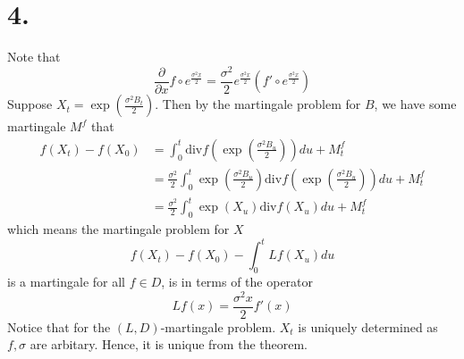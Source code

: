 \documentclass[11pt]{article}
\begin{document}
\section*{4.}
Note that 
\[
    \frac{\partial}{\partial x} f \circ e^{\frac{\sigma^2 x}{2}} = \frac{\sigma^2}{2} e^{\frac{\sigma^2 x}{2}} \left( f' \circ e^{\frac{\sigma^2 x}{2}} \right)
\]
Suppose $X_t = \exp\left(\frac{\sigma^2 B_t}{2}\right)$. Then by the martingale problem for $B$, we have some martingale 
$M^f$ that 
\begin{equation*}
    \begin{aligned}
        f(X_t) - f(X_0) &= \int_0^t \text{div} f\left(\exp\left(\frac{\sigma^2 B_u}{2}\right)\right) du  + M_t^f \\
        &= \frac{\sigma^2}{2} \int_0^t \exp\left(\frac{\sigma^2 B_u}{2}\right)  \text{div} f\left(\exp\left(\frac{\sigma^2 B_u}{2}\right)\right) du + M_t^f \\
        &= \frac{\sigma^2}{2} \int_0^t \exp(X_u) \text{div}f(X_u) du + M_t^f
    \end{aligned}
\end{equation*}
which means the martingale problem for $X$
\[
    f(X_t) - f(X_0) - \int_0^t Lf(X_u) du    
\]
is a martingale for all $f \in D$, is in terms of the operator 
\[
    Lf(x) = \frac{\sigma^2 x}{2}f'(x)    
\]
Notice that for the $(L, D)$-martingale problem. $X_t$ is uniquely determined as $f, \sigma$ are arbitary. Hence, it is unique from the theorem.
    
\end{document}
